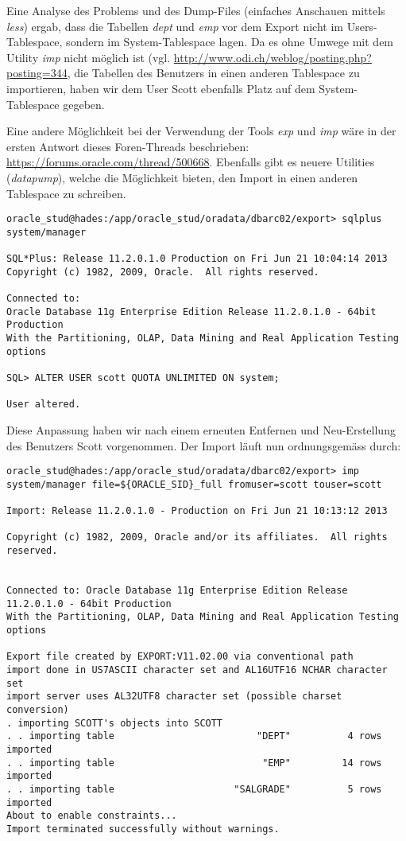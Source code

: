 \documentclass[11pt,a4paper,parskip=half]{scrartcl}
\begin{document}
Eine Analyse des Problems und des Dump-Files (einfaches Anschauen mittels \emph{less}) ergab, dass die Tabellen \emph{dept} und \emph{emp} vor dem Export nicht im Users-Tablespace, sondern im System-Tablespace lagen. Da es ohne Umwege mit dem Utility \emph{imp} nicht möglich ist (vgl. \url{http://www.odi.ch/weblog/posting.php?posting=344}, die Tabellen des Benutzers in einen anderen Tablespace zu importieren, haben wir dem User Scott ebenfalls Platz auf dem System-Tablespace gegeben.

Eine andere Möglichkeit bei der Verwendung der Tools \emph{exp} und \emph{imp} wäre in der ersten Antwort dieses Foren-Threads beschrieben: \url{https://forums.oracle.com/thread/500668}. Ebenfalls gibt es neuere Utilities (\emph{datapump}), welche die Möglichkeit bieten, den Import in einen anderen Tablespace zu schreiben.
\begin{lstlisting}
oracle_stud@hades:/app/oracle_stud/oradata/dbarc02/export> sqlplus system/manager

SQL*Plus: Release 11.2.0.1.0 Production on Fri Jun 21 10:04:14 2013
Copyright (c) 1982, 2009, Oracle.  All rights reserved.

Connected to:
Oracle Database 11g Enterprise Edition Release 11.2.0.1.0 - 64bit Production
With the Partitioning, OLAP, Data Mining and Real Application Testing options

SQL> ALTER USER scott QUOTA UNLIMITED ON system;

User altered.
\end{lstlisting}

Diese Anpassung haben wir nach einem erneuten Entfernen und Neu-Erstellung des Benutzers Scott vorgenommen. Der Import läuft nun ordnungsgemäss durch:
\begin{lstlisting}
oracle_stud@hades:/app/oracle_stud/oradata/dbarc02/export> imp system/manager file=${ORACLE_SID}_full fromuser=scott touser=scott

Import: Release 11.2.0.1.0 - Production on Fri Jun 21 10:13:12 2013

Copyright (c) 1982, 2009, Oracle and/or its affiliates.  All rights reserved.


Connected to: Oracle Database 11g Enterprise Edition Release 11.2.0.1.0 - 64bit Production
With the Partitioning, OLAP, Data Mining and Real Application Testing options

Export file created by EXPORT:V11.02.00 via conventional path
import done in US7ASCII character set and AL16UTF16 NCHAR character set
import server uses AL32UTF8 character set (possible charset conversion)
. importing SCOTT's objects into SCOTT
. . importing table                         "DEPT"          4 rows imported
. . importing table                          "EMP"         14 rows imported
. . importing table                     "SALGRADE"          5 rows imported
About to enable constraints...
Import terminated successfully without warnings.
\end{lstlisting}
\end{document}

